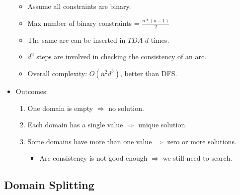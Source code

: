 \documentclass{article}
\begin{document}
\begin{itemize}
\begin{itemize}
            \item Assume all constraints are binary.
            \item Max number of binary constraints = $\frac{n * (n - 1)}{2}$
            \item The same arc can be inserted in $TDA$ $d$ times.
            \item $d^2$ steps are involved in checking the consistency of an arc.
            \item Overall complexity: $O(n^2d^3)$, better than DFS.
        \end{itemize}
    \item Outcomes:
        \begin{enumerate}
            \item One domain is empty $\Rightarrow$ no solution.
            \item Each domain has a single value $\Rightarrow$ unique solution.
            \item Some domains have more than one value $\Rightarrow$ zero or more solutions.
                \begin{itemize}
                    \item Arc consistency is not good enough $\Rightarrow$ we still need to search.
                \end{itemize}
        \end{enumerate}
\end{itemize}

\subsection{Domain Splitting}
\end{document}
